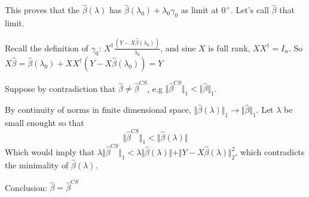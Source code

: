 \documentclass[12pt]{article}
\newcommand{\hbeta}{\hat \beta }
\newcommand{\norm}[1]{\Vert #1 \Vert}
\begin{document}
\begin{itemize}
  This proves that the $\hbeta(\lambda)$ has $\hbeta(\lambda_0) + \lambda_0 \gamma_0$ as limit at $0^+$. Let's call $\hbeta$ that limit.
  
  Recall the definition of $\gamma_0$: $X^{\dagger} \frac{(Y - X\hat \beta(\lambda_0))}{\lambda_0}$, and sine $X$ is full rank, $XX^{\dagger} = I_n$. So $X\hbeta = \hbeta(\lambda_0) +  XX^{\dagger}(Y - X\hbeta(\lambda_0)) = Y$

  Suppose by contradiction that $\hbeta \ne \hbeta^{CS}$, e.g  $\norm{\hbeta^{CS}}_1 < \norm{\hbeta}_1$.

  By continuity of norms in finite dimensional space, $\norm{\hbeta(\lambda)}_1 \rightarrow \norm{\hbeta}_1$. Let $\lambda$ be small enought so that
  $$ \norm{\hbeta^{CS}}_1 < \norm{\hbeta(\lambda)} $$
  Which would imply that   $ \lambda \norm{\hbeta^{CS}}_1 < \lambda \norm{\hbeta(\lambda)} + \norm{Y - X\hbeta(\lambda)}_2^2$, which contradicts the minimality of $\hbeta(\lambda)$.
  
  Conclusion:  $\hbeta = \hbeta^{CS}$
  
\end{itemize}
\end{document}
